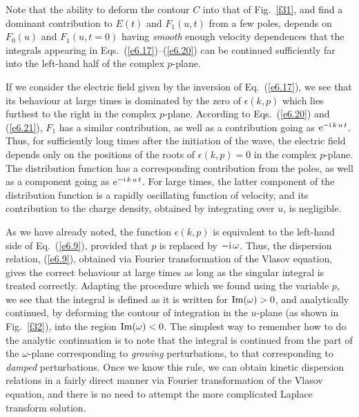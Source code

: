 Note that the ability to deform the contour $C$ into that of Fig.~\ref{f31}, and find
a dominant contribution to $E(t)$ and
$F_1(u,t)$  from a few poles, depends on $F_0(u)$ and $F_1(u,t=0)$
having  {\em smooth}\/ enough
 velocity dependences that the integrals appearing in
Eqs.~(\ref{e6.17})--(\ref{e6.20}) can be continued sufficiently far into the left-hand
half of the complex $p$-plane.

If we consider the electric field given by the inversion of Eq.~(\ref{e6.17}),
we see that its behaviour at large times is dominated by the zero of $\epsilon(k, p)$
which lies furthest to the right in the complex $p$-plane.
According to Eqs.~(\ref{e6.20}) and (\ref{e6.21}), $F_1$
has a similar contribution, as well as a contribution going as ${\rm e}^{-{\rm i}\,k\,u\,t}$. Thus, for sufficiently long times after the initiation of
the wave, the electric field depends only on the positions of the
roots of $\epsilon(k,p)=0$ in the complex $p$-plane. The distribution function
has a corresponding contribution
from the poles, as well as a component going as ${\rm e}^{-{\rm i}\,k\,u\,t}$. 
For large times, the latter component of the distribution function is
a rapidly oscillating function of velocity, and its contribution to the
charge density, obtained by integrating over $u$, is negligible. 

As we have already noted, the function $\epsilon(k, p)$ is equivalent to the
left-hand side of Eq.~(\ref{e6.9}), provided that $p$ is replaced by $-{\rm i}\,\omega$.
Thus, the dispersion relation, (\ref{e6.9}), obtained via Fourier transformation of the
Vlasov equation,
gives the correct behaviour at large times as long as the singular integral
is treated correctly. Adapting the procedure which we found using the
variable $p$, we see that the integral is defined as it is written for
${\rm Im}(\omega)>0$, and analytically continued, by deforming the
contour of integration in the $u$-plane (as shown in Fig.~\ref{f32}), into the region
${\rm Im}(\omega)<0$. The simplest way to remember how to do the
analytic continuation is to note that the integral is
continued from the part of the $\omega$-plane corresponding to {\em growing}\/
perturbations, to that corresponding to {\em damped}\/ perturbations. Once we
know this rule, we can obtain kinetic dispersion relations in a fairly direct manner
via  Fourier
transformation of the Vlasov
equation, and there is no need to attempt the more complicated Laplace transform
solution.

